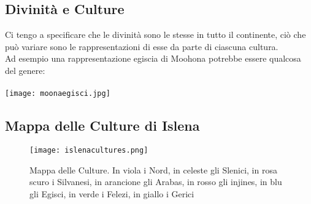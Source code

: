 \documentclass[a4paper]{report}
\begin{document}
\begin{multicols}{2}
\subsection*{Divinità e Culture}
Ci tengo a specificare che le divinità sono le stesse in tutto il continente, ciò che può variare sono le rappresentazioni di esse da parte di ciascuna cultura. \\
Ad esempio una rappresentazione egiscia di Moohona potrebbe essere qualcosa del genere:\\
\\

\texttt{[image: moonaegisci.jpg]}
\end{multicols}
\newpage
\subsection{Mappa delle Culture di Islena}
\begin{figure}[h!]
	\centering
	\texttt{[image: islenacultures.png]}
	\caption{Mappa delle Culture. In viola i Nord, in celeste gli Slenici, in rosa scuro i Silvanesi, in arancione gli Arabas, in rosso gli injines, in blu gli Egisci, in verde i Felezi, in giallo i Gerici}
\end{figure}
\end{document}
